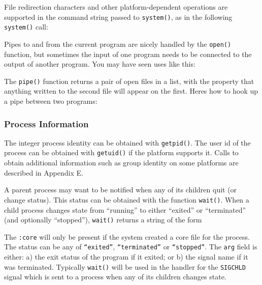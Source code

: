 
\noindent
File redirection characters and other platform-dependent operations are
supported in the command string passed to \texttt{system()}, as
in the following \texttt{system()} call:


Pipes to and from the current program are nicely handled by the
\texttt{open()} function, but sometimes the input of one program needs
to be connected to the output of another program. You may have seen
uses like this:


The \texttt{pipe()} function returns a pair of open files in a list,
with the property that anything written to the second file will appear
on the first. Here{\textquotesingle}s how to hook up a pipe between two
programs:


\subsubsection{Process Information}

The integer process identity can be obtained with
\texttt{getpid()}. The user id of the process can be
obtained with \texttt{getuid()} if the platform
supports it. Calls to obtain additional information such as group
identity on some platforms are described in Appendix E.

A parent process may want to be notified when any of its children quit
(or change status). This status can be obtained with the function
\texttt{wait()}. When a child process changes state from
``running'' to either
``exited'' or
``terminated'' (and optionally
``stopped''), \texttt{wait()} returns a
string of the form


The \texttt{{\textquotedbl}:core{\textquotedbl}} will only be present if
the system created a core file for the process. The status can be any
of \texttt{``exited''},
\texttt{``terminated''} or
\texttt{``stopped''}. The \texttt{arg} field
is either: a) the exit status of the program if it exited; or b) the
signal name if it was terminated. Typically \texttt{wait()} will be
used in the handler for the \texttt{SIGCHLD} signal which is sent to a
process when any of its children changes state.

